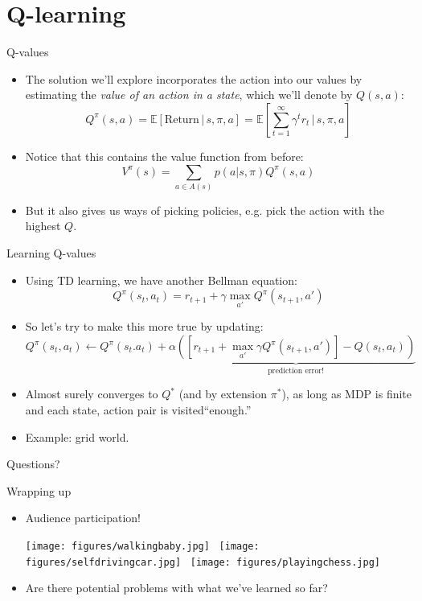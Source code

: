 \documentclass[handout]{beamer} %
\newcommand{\E}[1]{\mathbb{E}\left[#1\right]}
\begin{document}
\section{Q-learning}


\begin{frame}{Q-values}
\begin{itemize}
\item The solution we'll explore incorporates the action into our values by estimating the \emph{value of an action in a state}, which we'll denote by \(Q(s,a)\):
    \[Q^\pi(s,a) = \E{\text{Return} \, |\, s, \pi, a} = \E{\sum_{t=1}^\infty \gamma^t r_t \, \bigg \vert \, s, \pi, a } \]
\item<2-> Notice that this contains the value function from before:
    \[V^\pi(s) = \sum_{a \in A(s)} p(a | s, \pi) Q^{\pi} (s, a)\]
\item<3-> But it also gives us ways of picking policies, e.g. pick the action with the highest \(Q\).
\end{itemize}
\end{frame}

\begin{frame}{Learning Q-values}
\begin{itemize}
    \item<1-> Using TD learning, we have another Bellman equation:
        \[Q^{\pi}\left(s_{t}, a_t\right) = r_{t+1} + \gamma \max_{a'} Q^{\pi}\left(s_{t+1}, a'\right) \] 
    \item<2-> So let's try to make this more true by updating: 
        {\small
        \[Q^{\pi}(s_{t}, a_t) \leftarrow Q^{\pi}(s_t. a_t) + \alpha \underbrace{\left( \left[ r_{t+1} + \max_{a'} \gamma Q^{\pi}(s_{t+1}, a') \right] - Q(s_t, a_t)\right)}_{\text{prediction error!}}\]}
    \item<3-> Almost surely converges to \(Q^*\) (and by extension \(\pi^*\)), as long as MDP is finite and each state, action pair is visited``enough.'' 
    \item<4-> Example: grid world.
\end{itemize}
\end{frame}

\begin{frame}[standout]
Questions?
\end{frame}

\begin{frame}{Wrapping up}
\begin{itemize}
    \item Audience participation!
    \begin{center}
        \texttt{[image: figures/walkingbaby.jpg]}~
        \texttt{[image: figures/selfdrivingcar.jpg]}~
        \texttt{[image: figures/playingchess.jpg]}
    \end{center}
    \item<2-> Are there potential problems with what we've learned so far?
    
\end{itemize}
\end{frame}
\end{document}
